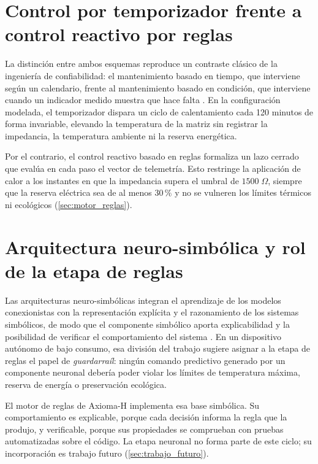 \section{Control por temporizador frente a control reactivo por reglas}
La distinci\'on entre ambos esquemas reproduce un contraste cl\'asico de la ingenier\'ia de confiabilidad: el mantenimiento basado en tiempo, que interviene seg\'un un calendario, frente al mantenimiento basado en condici\'on, que interviene cuando un indicador medido muestra que hace falta \parencite{jardine2006review}. En la configuraci\'on modelada, el temporizador dispara un ciclo de calentamiento cada 120 minutos de forma invariable, elevando la temperatura de la matriz sin registrar la impedancia, la temperatura ambiente ni la reserva energ\'etica.

Por el contrario, el control reactivo basado en reglas formaliza un lazo cerrado que eval\'ua en cada paso el vector de telemetr\'ia. Esto restringe la aplicaci\'on de calor a los instantes en que la impedancia supera el umbral de $1500\;\Omega$, siempre que la reserva el\'ectrica sea de al menos $30\,\%$ y no se vulneren los l\'imites t\'ermicos ni ecol\'ogicos (\cref{sec:motor_reglas}).

\section{Arquitectura neuro-simb\'olica y rol de la etapa de reglas}
Las arquitecturas neuro-simb\'olicas integran el aprendizaje de los modelos conexionistas con la representaci\'on expl\'icita y el razonamiento de los sistemas simb\'olicos, de modo que el componente simb\'olico aporta explicabilidad y la posibilidad de verificar el comportamiento del sistema \parencite{garcez2023neurosymbolic}. En un dispositivo aut\'onomo de bajo consumo, esa divisi\'on del trabajo sugiere asignar a la etapa de reglas el papel de \emph{guardarra\'il}: ning\'un comando predictivo generado por un componente neuronal deber\'ia poder violar los l\'imites de temperatura m\'axima, reserva de energ\'ia o preservaci\'on ecol\'ogica.

El motor de reglas de Axioma-H implementa esa base simb\'olica. Su comportamiento es explicable, porque cada decisi\'on informa la regla que la produjo, y verificable, porque sus propiedades se comprueban con pruebas automatizadas sobre el c\'odigo. La etapa neuronal no forma parte de este ciclo; su incorporaci\'on es trabajo futuro (\cref{sec:trabajo_futuro}).

